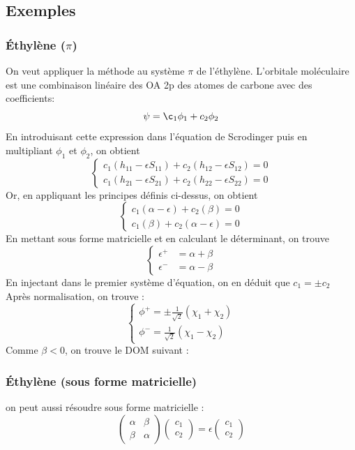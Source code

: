 \documentclass[french]{yLectureNote}
\begin{document}
\subsection{Exemples}
\subsubsection{Éthylène ($\pi$)}
On veut appliquer la méthode au système \(\pi\) de l'éthylène. L'orbitale moléculaire est une combinaison linéaire des OA 2p des atomes de carbone avec des coefficients: \[\psi = \c_1\phi_1+c_2\phi_2\]
En introduisant cette expression dans l'équation de Scrodinger puis en multipliant \(\phi_1\) et \(\phi_2\), on obtient \[ \left\{\begin{matrix}
c_1(h_{11}-\epsilon S_{11}) + c_2(h_{12}-\epsilon S_{12}) = 0\\
c_1(h_{21}-\epsilon S_{21}) + c_2(h_{22}-\epsilon S_{22}) = 0
\end{matrix}\right.\] Or, en appliquant les principes définis ci-dessus, on obtient
\[ \left\{\begin{matrix}
c_1(\alpha-\epsilon) + c_2(\beta) = 0\\
c_1(\beta) + c_2(\alpha-\epsilon ) = 0
\end{matrix}\right.\]
En mettant sous forme matricielle et en calculant le déterminant, on trouve \[ \left\{\begin{matrix}
\epsilon^+ &=\alpha+\beta\\
\epsilon^-&=\alpha-\beta
\end{matrix}\right.\]
En injectant dans le premier système d'équation, on en déduit que \(c_1 = \pm c_2\) Après normalisation, on trouve :
\[ \left\{\begin{matrix}
\phi^+ = \pm \frac{1}{\sqrt{2}}(\chi_1+\chi_2)\\
\phi^- = \frac{1}{\sqrt{2}}(\chi_1-\chi_2)
\end{matrix}\right.\]
Comme \(\beta <0\), on trouve le DOM suivant :

\subsubsection{Éthylène (sous forme matricielle)}
on peut aussi résoudre sous forme matricielle :
\[\begin{pmatrix}\alpha&\beta\\ \beta &\alpha \end{pmatrix} \begin{pmatrix}c_1\\c_2 \end{pmatrix} = \epsilon \begin{pmatrix}c_1\\c_2 \end{pmatrix}\]
\end{document}
